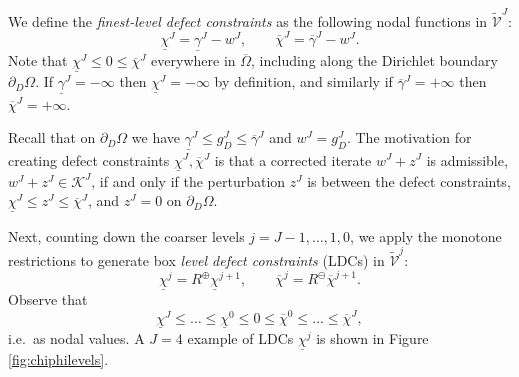 \documentclass[letterpaper,final,12pt,reqno]{amsart}
\theoremstyle{cstyle}
\theoremstyle{cstyle*}
\theoremstyle{dstyle}
\numberwithin{equation}{section}
\numberwithin{figure}{section}
\numberwithin{table}{section}
\numberwithin{theorem}{section}
\newcommand{\cK}{\mathcal{K}}
\newcommand{\maxR}{R^{\bm{\oplus}}}
\newcommand{\minR}{R^{\bm{\ominus}}}
\begin{document}
We define the \emph{finest-level defect constraints} \cite{GraeserKornhuber2009} as the following nodal functions in $\tilde{\mathcal{V}}^J$:
\begin{equation}
\underline{\chi}^J = \underline{\gamma}^J - w^J, \qquad \overline{\chi}^J = \overline{\gamma}^J - w^J. \label{eq:fe:defectconstraints}
\end{equation}
Note that $\underline{\chi}^J \le 0 \le \overline{\chi}^J$ everywhere in $\overline{\Omega}$, including along the Dirichlet boundary $\partial_D\Omega$.  If $\underline{\gamma}^J=-\infty$ then $\underline{\chi}^J=-\infty$ by definition, and similarly if $\overline{\gamma}^J=+\infty$ then $\overline{\chi}^J=+\infty$.

Recall that on $\partial_D\Omega$ we have $\underline{\gamma}^J \le g_D^J \le \overline{\gamma}^J$ and $w^J = g_D^J$.  The motivation for creating defect constraints $\underline{\chi}^J,\overline{\chi}^J$ is that a corrected iterate $w^J + z^J$ is admissible, $w^J + z^J \in \cK^J$, if and only if the perturbation $z^J$ is between the defect constraints, $\underline{\chi}^J \le z^J \le \overline{\chi}^J$, and $z^J=0$ on $\partial_D\Omega$.

Next, counting down the coarser levels $j=J-1,\dots,1,0$, we apply the monotone restrictions to generate box \emph{level defect constraints} (LDCs) in $\tilde{\mathcal{V}}^j$:
\begin{equation}
\underline{\chi}^{j} = \maxR \underline{\chi}^{j+1}, \qquad \overline{\chi}^{j} = \minR \overline{\chi}^{j+1}. \label{eq:fe:chilevels}
\end{equation}
Observe that
\begin{equation}
\underline{\chi}^{J} \le \dots \le \underline{\chi}^0 \le 0 \le \overline{\chi}^0 \le \dots \le \overline{\chi}^J, \label{eq:fe:chiordering}
\end{equation}
i.e.~as nodal values.  A $J=4$ example of LDCs $\underline{\chi}^j$ is shown in Figure \ref{fig:chiphilevels}.
\end{document}
